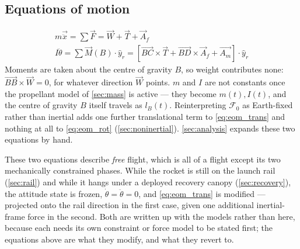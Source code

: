 \subsection{Equations of motion}\label{sec:eom}
\begin{gather}
    m\vec{\ddot{x}} = \sum \vec{F} = \vec{W} + \vec{T} + \vec{A}_f \label{eq:eom_trans}\\
    I\ddot{\theta} = \sum \vec{M}(B) \cdot \hat{y}_r = \left[\vec{BC}\times\vec{T} + \vec{BD}\times\vec{A}_f + \vec{A_m}\right]\cdot \hat{y}_r \label{eq:eom_rot}
\end{gather}
Moments are taken about the centre of gravity $B$, so weight contributes none:
$\vec{BB}\times\vec{W}=0$, for whatever direction $\vec{W}$ points. $m$ and $I$ are not constants
once the propellant model of \autoref{sec:mass} is active --- they become $m(t), I(t)$, and the
centre of gravity $B$ itself travels as $l_B(t)$. Reinterpreting $\mathcal{F}_0$ as Earth-fixed
rather than inertial adds one further translational term to \autoref{eq:eom_trans} and nothing at
all to \autoref{eq:eom_rot} (\autoref{sec:noninertial}). \autoref{sec:analysis} expands these two
equations by hand.

These two equations describe \emph{free} flight, which is all of a flight except its two
mechanically constrained phases. While the rocket is still on the launch rail
(\autoref{sec:rail}) and while it hangs under a deployed recovery canopy (\autoref{sec:recovery}),
the attitude state is frozen, $\dot\theta=\ddot\theta=0$, and \autoref{eq:eom_trans} is modified
--- projected onto the rail direction in the first case, given one additional inertial-frame force
in the second. Both are written up with the models rather than here, because each needs its own
constraint or force model to be stated first; the equations above are what they modify, and what
they revert to.
